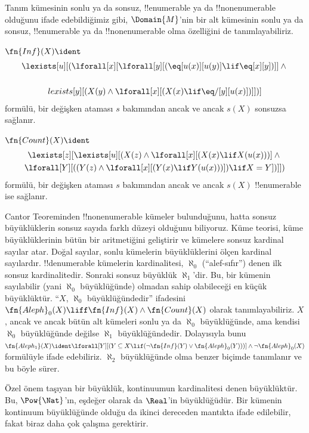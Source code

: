 \documentclass[../../../include/open-logic-section]{subfiles}
\begin{document}


\begin{explain}
Tanım kümesinin sonlu ya da sonsuz, !!{enumerable} ya da !!{nonenumerable}
olduğunu ifade edebildiğimiz gibi, $\Domain{M}$'nin bir alt kümesinin sonlu
ya da sonsuz, !!{enumerable} ya da !!{nonenumerable} olma özelliğini de
tanımlayabiliriz.
\end{explain}

\begin{prop}
$\fn{Inf}(X)\ident$
\begin{multline*}
\lexists[u][(\lforall[x][\lforall[y][(\eq[u(x)][u(y)] \lif 
      \eq[x][y])]] \land {} \\\\lexists[y][(X(y) \land \lforall[x][(X(x)
      \lif \eq/[y][u(x)])]])]
\end{multline*}
formülü, bir değişken ataması $s$ bakımından ancak ve ancak $s(X)$ sonsuzsa
sağlanır.
\end{prop}

\begin{prop}
$\fn{Count}(X)\ident$
\begin{multline*}
\lexists[z][\lexists[u][(X(z) \land 
    \lforall[x][(X(x) \lif X(u(x)))] \land {} \\ \lforall[Y][((Y(z) \land
      \lforall[x][(Y(x) \lif Y(u(x)))]) \lif X = Y])]])
\end{multline*}
formülü, bir değişken ataması $s$ bakımından ancak ve ancak $s(X)$
!!{enumerable} ise sağlanır.
\end{prop}

Cantor Teoreminden !!{nonenumerable} kümeler bulunduğunu, hatta sonsuz
büyüklüklerin sonsuz sayıda farklı düzeyi olduğunu biliyoruz. Küme teorisi,
küme büyüklüklerinin bütün bir aritmetiğini geliştirir ve kümelere sonsuz
kardinal sayılar atar. Doğal sayılar, sonlu kümelerin büyüklüklerini ölçen
kardinal sayılardır. !!{denumerable} kümelerin kardinalitesi, $\aleph_0$
(``alef-sıfır'') denen ilk sonsuz kardinalitedir. Sonraki sonsuz büyüklük
$\aleph_1$'dir. Bu, bir kümenin sayılabilir (yani $\aleph_0$ büyüklüğünde)
olmadan sahip olabileceği en küçük büyüklüktür. ``$X$, $\aleph_0$
büyüklüğündedir'' ifadesini
$\fn{Aleph}_0(X)\liff\fn{Inf}(X)\land\fn{Count}(X)$ olarak tanımlayabiliriz.
$X$, ancak ve ancak bütün alt kümeleri sonlu ya da $\aleph_0$ büyüklüğünde,
ama kendisi $\aleph_0$ büyüklüğünde değilse $\aleph_1$ büyüklüğündedir.
Dolayısıyla bunu
$\fn{Aleph_1}(X)\ident\lforall[Y][(Y\subseteq X\lif
(\lnot\fn{Inf}(Y)\lor\fn{Aleph}_0(Y)))]\land\lnot\fn{Aleph}_0(X)$
formülüyle ifade edebiliriz. $\aleph_2$ büyüklüğünde olma benzer biçimde
tanımlanır ve bu böyle sürer.

Özel önem taşıyan bir büyüklük, kontinuumun kardinalitesi denen büyüklüktür.
Bu, $\Pow{\Nat}$'ın, eşdeğer olarak da $\Real$'in büyüklüğüdür. Bir kümenin
kontinuum büyüklüğünde olduğu da ikinci dereceden mantıkta ifade edilebilir,
fakat biraz daha çok çalışma gerektirir.
\end{document}

